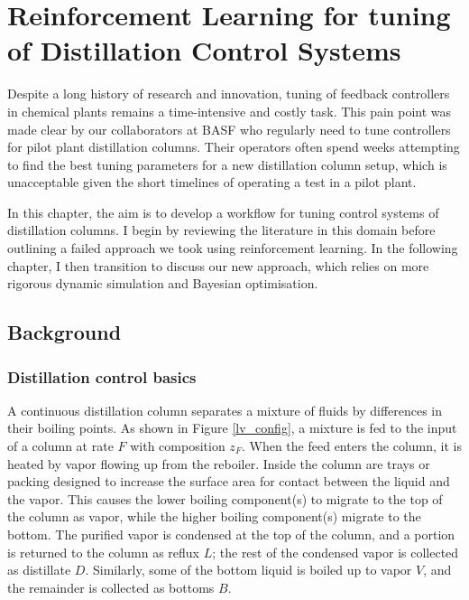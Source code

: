 \chapter{Reinforcement Learning for tuning of  Distillation Control Systems}\label{ch:rl_tuning} 
Despite a long history of research and innovation, tuning of feedback controllers in chemical plants remains a time-intensive and costly task. This pain point was made clear by our collaborators at BASF who regularly need to tune controllers for pilot plant distillation columns. Their operators often spend weeks attempting to find the best tuning parameters for a new distillation column setup, which is unacceptable given the short timelines of operating a test in a pilot plant.

In this chapter, the aim is to develop a workflow for tuning control systems of distillation columns. I begin by reviewing the literature in this domain before outlining a failed approach we took using reinforcement learning.  In the following chapter, I then transition to discuss our new approach, which relies on more rigorous dynamic simulation and Bayesian optimisation.

\section{Background}


\subsection{Distillation control basics}
A continuous distillation column separates a mixture of fluids by differences in their boiling points. As shown in Figure \ref{lv_config}, a mixture is fed to the input of a column at rate $F$ with composition $z_F$.  When the feed enters the column, it is heated by vapor flowing up from the reboiler. Inside the column are trays or packing designed to increase the surface area for contact between the liquid and the vapor. This causes the lower boiling component(s) to migrate to the top of the column as vapor, while the higher boiling component(s) migrate to the bottom. The purified vapor is condensed at the top of the column, and a portion is returned to the column as reflux $L$; the rest of the condensed vapor is collected as distillate $D$. Similarly, some of the bottom liquid is boiled up to vapor $V$, and the remainder is collected as bottoms $B$.

